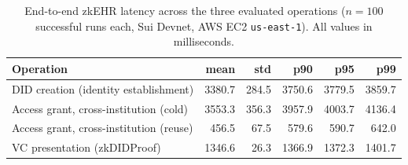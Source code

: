\begin{table}[htbp]
\centering
\caption{End-to-end zkEHR latency across the three evaluated operations
($n=100$ successful runs each, Sui Devnet, AWS EC2 \texttt{us-east-1}).
All values in milliseconds.}
\label{tab:zkehr-latency-summary}
\small
\setlength{\tabcolsep}{5pt}
\begin{tabular}{l r r r r r}
\toprule
\textbf{Operation} & \textbf{mean} & \textbf{std} & \textbf{p90} & \textbf{p95} & \textbf{p99} \\
\midrule
DID creation (identity establishment)      & 3380.7 & 284.5 & 3750.6 & 3779.5 & 3859.7 \\
Access grant, cross-institution (cold)     & 3553.3 & 356.3 & 3957.9 & 4003.7 & 4136.4 \\
Access grant, cross-institution (reuse)    &  456.5 &  67.5 &  579.6 &  590.7 &  642.0 \\
VC presentation (zkDIDProof)               & 1346.6 &  26.3 & 1366.9 & 1372.3 & 1401.7 \\
\bottomrule
\end{tabular}
\end{table}
